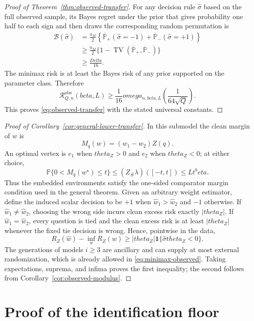 \documentclass[11pt]{article}
\def\beta{beta}%
\def\theta{theta}%
\def\omega{omega}%
\def\Delta{Delta}%
\newcommand{\Pp}{\mathbb P}
\newcommand{\one}{\mathbf 1}
\newcommand{\TV}{\operatorname{TV}}
\newcommand{\calR}{\mathcal R}
\begin{document}
\begin{proof}[Proof of Theorem~\ref{thm:observed-transfer}]
For any decision rule $\widehat\sigma$ based on the full observed sample, its Bayes regret under the prior that gives probability one half to each sign and then draws the corresponding random permutation is
\begin{align*}
\mathcal B(\widehat\sigma)
&=
\frac{a_M}{2}
\left\{
\overline{\mathbb P}_+(\widehat\sigma=-1)
+
\overline{\mathbb P}_-(\widehat\sigma=+1)
\right\}\\
&\ge
\frac{a_M}{2}
\{1-\TV(\overline{\mathbb P}_+,\overline{\mathbb P}_-)\}\\
&\ge
\frac{\Delta}{16}.
\end{align*}
The minimax risk is at least the Bayes risk of any prior supported on the parameter class.  Therefore
\[
\calR^{\mathrm{obs}}_{Q,n}(\beta,L)
\ge
\frac1{16}\omega_{n,\beta,L}\!\left(\frac{1}{64\sqrt Q}\right).
\]
This proves \eqref{eq:observed-transfer} with the stated universal constants.
\end{proof}

\begin{proof}[Proof of Corollary~\ref{cor:general-lower-transfer}]
In this submodel the clean margin of $w$ is
\[
M_q(w)=(w_1-w_2)Z(q).
\]
An optimal vertex is $e_1$ when $\theta_Z>0$ and $e_2$ when $\theta_Z<0$; at either choice,
\[
\Pp\{0<M_q(w^\star)\le t\}
\le
(Z_\#\lambda)([-t,t])
\le Lt^\beta.
\]
Thus the embedded environments satisfy the one-sided comparator margin condition used in the general theorem.  Given an arbitrary weight estimator, define the induced scalar decision to be $+1$ when $\widehat w_1>\widehat w_2$ and $-1$ otherwise.  If $\widehat w_1\ne\widehat w_2$, choosing the wrong side incurs clean excess risk exactly $|\theta_Z|$.  If $\widehat w_1=\widehat w_2$, every question is tied and the clean excess risk is at least $|\theta_Z|$ whenever the fixed tie decision is wrong.  Hence, pointwise in the data,
\[
R_Z(\widehat w)-\inf_wR_Z(w)
\ge
|\theta_Z|\one\{\widehat\sigma\theta_Z<0\}.
\]
The generations of models $i\ge3$ are ancillary and can supply at most external randomization, which is already allowed in \eqref{eq:minimax-observed}.  Taking expectations, suprema, and infima proves the first inequality; the second follows from Corollary~\ref{cor:observed-modulus}.
\end{proof}


\section{Proof of the identification floor}
\label{app:identification}
\end{document}
